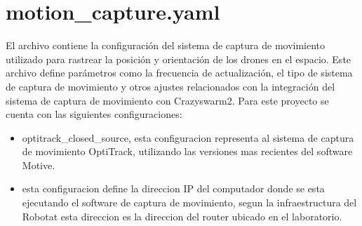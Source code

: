 \documentclass[a4paper,11pt,spanish]{sphinxmanual}
\begin{document}
\section{motion\_capture.yaml}
\label{\detokenize{configuracion:motion-capture-yaml}}
\sphinxAtStartPar
El archivo  contiene la configuración del sistema de captura de movimiento utilizado para rastrear la posición y orientación de los drones en el espacio. Este archivo define parámetros como la frecuencia de actualización, el tipo de sistema de captura de movimiento y otros ajustes relacionados con la integración del sistema de captura de movimiento con Crazyswarm2. Para este proyecto se cuenta con las siguientes configuraciones:
\begin{itemize}
\item {} 
\sphinxAtStartPar
{} optitrack\_closed\_source, esta configuracion representa al sistema de captura de movimiento OptiTrack, utilizando las versiones mas recientes del software Motive.

\item {} 
\sphinxAtStartPar
{} esta configuracion define la direccion IP del computador donde se esta ejecutando el software de captura de movimiento, segun la infraestructura del Robotat esta direccion es la direccion del router ubicado en el laboratorio.

\end{itemize}

\begin{sphinxVerbatim}[commandchars=\\\{\}]
\end{sphinxVerbatim}
\end{document}
